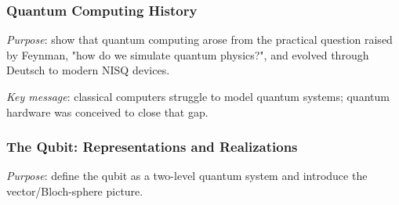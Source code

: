 \subsubsection{Quantum Computing History}

\emph{Purpose}: show that quantum computing arose from the practical question raised by Feynman,  "how do we simulate quantum physics?", 
and evolved through Deutsch to modern NISQ devices.



\emph{Key message}: classical computers struggle to model quantum systems; quantum hardware was conceived to close that gap.


\subsubsection{The Qubit: Representations and Realizations}

\emph{Purpose}: define the qubit as a two-level quantum system and introduce the vector/Bloch-sphere picture.


